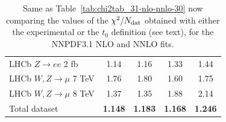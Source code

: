 \begin{table}[t]
\begin{center}
\begin{tabular}{|l|c|c||c|c|}
LHCb $Z\to ee$ 2 fb     &    1.14   &   1.16   &   1.33   &   1.44  \\    
LHCb $W,Z \to \mu$ 7 TeV    &    1.76   &   1.80   &   1.60   &   1.75  \\    
LHCb $W,Z \to \mu$ 8 TeV    &    1.37   &   1.35   &   1.88   &   2.14  \\    
\hline
\hline
Total dataset     &  {\bf  1.148}   &{\bf   1.183}   & {\bf  1.168}   & {\bf  1.246}  \\    
\hline
\end{tabular}
\caption{\small
  \label{tab:chi2tab_exp_vs_t0}
  Same as Table~\ref{tab:chi2tab_31-nlo-nnlo-30} now comparing the values of
  the  $\chi^2/N_{\rm dat}$ obtained with either  
  the experimental or the $t_0$ definition (see text), for the NNPDF3.1 NLO and NNLO fits.
}
\end{center}
\end{table}

